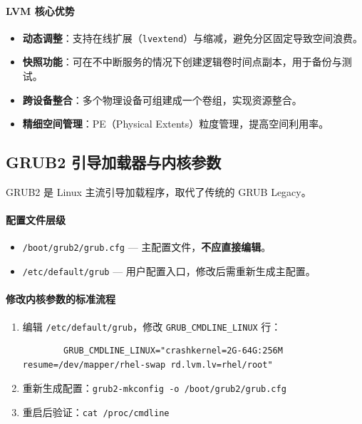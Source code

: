 \documentclass[12pt,UTF8]{ctexbook}
\begin{document}
\paragraph{LVM 核心优势}
\begin{itemize}
	\item \textbf{动态调整}：支持在线扩展（\verb|lvextend|）与缩减，避免分区固定导致空间浪费。
	\item \textbf{快照功能}：可在不中断服务的情况下创建逻辑卷时间点副本，用于备份与测试。
	\item \textbf{跨设备整合}：多个物理设备可组建成一个卷组，实现资源整合。
	\item \textbf{精细空间管理}：PE（Physical Extents）粒度管理，提高空间利用率。
\end{itemize}

\subsection{GRUB2 引导加载器与内核参数}

GRUB2 是 Linux 主流引导加载程序，取代了传统的 GRUB Legacy。
	
\paragraph{配置文件层级}

\begin{itemize}
	\item \texttt{/boot/grub2/grub.cfg} --- 主配置文件，\textbf{不应直接编辑}。
	\item \texttt{/etc/default/grub} --- 用户配置入口，修改后需重新生成主配置。
\end{itemize}
	
\paragraph{修改内核参数的标准流程}

\begin{enumerate}
	\item 编辑 \texttt{/etc/default/grub}，修改 \texttt{GRUB\_CMDLINE\_LINUX} 行：
	\begin{verbatim}
		GRUB_CMDLINE_LINUX="crashkernel=2G-64G:256M resume=/dev/mapper/rhel-swap rd.lvm.lv=rhel/root"
	\end{verbatim}
	\item 重新生成配置：\verb|grub2-mkconfig -o /boot/grub2/grub.cfg|
	\item 重启后验证：\verb|cat /proc/cmdline|
\end{enumerate}
	
\end{document}
